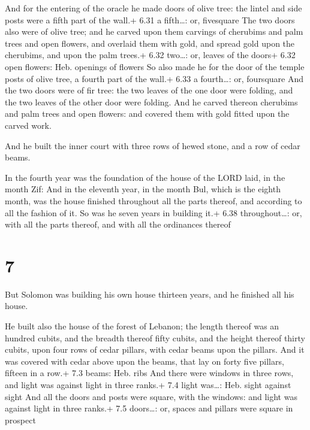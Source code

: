  And for the entering of the oracle he made doors of
olive tree: the lintel and side posts were a fifth part of the wall.+
6.31 a fifth\ldots: or, fivesquare  The two doors also were
of olive tree; and he carved upon them carvings of cherubims and palm
trees and open flowers, and overlaid them with gold, and spread gold
upon the cherubims, and upon the palm trees.+ 6.32 two\ldots: or, leaves
of the doors+ 6.32 open flowers: Heb. openings of flowers 
So also made he for the door of the temple posts of olive tree, a fourth
part of the wall.+ 6.33 a fourth\ldots: or, foursquare  And
the two doors were of fir tree: the two leaves of the one door were
folding, and the two leaves of the other door were folding.
 And he carved thereon cherubims and palm trees and open
flowers: and covered them with gold fitted upon the carved work.

 And he built the inner court with three rows of hewed
stone, and a row of cedar beams.

 In the fourth year was the foundation of the house of
the LORD laid, in the month Zif:  And in the eleventh year,
in the month Bul, which is the eighth month, was the house finished
throughout all the parts thereof, and according to all the fashion of
it. So was he seven years in building it.+ 6.38 throughout\ldots: or,
with all the parts thereof, and with all the ordinances thereof

\hypertarget{section-6}{%
\section{7}\label{section-6}}

 But Solomon was building his own house thirteen years, and
he finished all his house.

 He built also the house of the forest of Lebanon; the
length thereof was an hundred cubits, and the breadth thereof fifty
cubits, and the height thereof thirty cubits, upon four rows of cedar
pillars, with cedar beams upon the pillars.  And it was
covered with cedar above upon the beams, that lay on forty five pillars,
fifteen in a row.+ 7.3 beams: Heb. ribs  And there were
windows in three rows, and light was against light in three ranks.+ 7.4
light was\ldots: Heb. sight against sight  And all the doors
and posts were square, with the windows: and light was against light in
three ranks.+ 7.5 doors\ldots: or, spaces and pillars were square in
prospect

